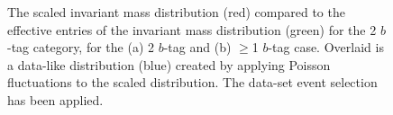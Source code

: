 \begin{figure}[!ht]
  \begin{center}
   \captionsetup[subfigure]{aboveskip=0pt,justification=centering}
  \end{center}
  \caption{The scaled invariant mass distribution (red) compared to the
    effective entries of the invariant mass distribution (green) for the 2 $b$-tag category,
    for the (a) 2 $b$-tag and (b) $\geq$1 $b$-tag case.
    Overlaid is a data-like distribution (blue) created by applying Poisson fluctuations to the scaled distribution.
    The \summer{} data-set event selection has been applied.}
  \label{fig:effEntDataLike}
\end{figure}

